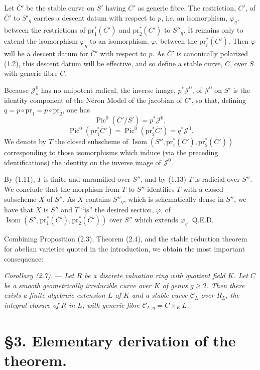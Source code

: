 \documentclass[10pt]{article}
\newcommand{\Isom}{\operatorname{Isom}}
\newcommand{\Pic}{\operatorname{Pic}}
\begin{document}
Let $\overline C'$ be the stable curve on $S'$ having $C'$ as generic fibre. The restriction, $C'$, of $\overline C'$ to $S'_\eta$ carries a descent datum with respect to $p$, i.e. an isomorphism, $\varphi_\eta$, between the restrictions of $\mathrm{pr}_1^*(\overline C')$ and $\mathrm{pr}_2^*(\overline C')$ to $S''_\eta$. It remains only to extend the isomorphism $\varphi_\eta$ to an isomorphism, $\varphi$, between the $\mathrm{pr}_i^*(\overline C')$. Then $\varphi$ will be a descent datum for $\overline C'$ with respect to $p$. As $\overline C'$ is canonically polarized (1.2), this descent datum will be effective, and so define a stable curve, $\overline C$, over $S$ with generic fibre $C$.

Because $\mathscr J_s^0$ has no unipotent radical, the inverse image, $p^*\mathscr J^0$, of $\mathscr J^0$ on $S'$ is the identity component of the Néron Model of the jacobian of $C'$, so that, defining $q=p\circ\mathrm{pr}_1=p\circ\mathrm{pr}_2$, one has
\[
\Pic^0(\overline C'/S')=p^*\mathscr J^0,
\]
\[
\Pic^0(\mathrm{pr}_1^*\overline C')=\Pic^0(\mathrm{pr}_2^*\overline C')=q^*\mathscr J^0.
\]
We denote by $T$ the closed subscheme of $\Isom(S'',\mathrm{pr}_1^*(\overline C'),\mathrm{pr}_2^*(\overline C'))$ corresponding to those isomorphisms which induce (via the preceding identifications) the identity on the inverse image of $\mathscr J^0$.

By (1.11), $T$ is finite and unramified over $S''$, and by (1.13) $T$ is radicial over $S''$. We conclude that the morphism from $T$ to $S''$ identifies $T$ with a closed subscheme $X$ of $S''$. As $X$ contains $S''_\eta$, which is schematically dense in $S''$, we have that $X$ is $S''$ and $T$ ``is'' the desired section, $\varphi$, of $\Isom(S'',\mathrm{pr}_1^*(\overline C'),\mathrm{pr}_2^*(\overline C'))$ over $S''$ which extends $\varphi_\eta$. Q.E.D.

Combining Proposition (2.3), Theorem (2.4), and the stable reduction theorem for abelian varieties quoted in the introduction, we obtain the most important consequence:

\medskip
\noindent\emph{Corollary (2.7).} --- \emph{Let $R$ be a discrete valuation ring with quotient field $K$. Let $C$ be a smooth geometrically irreducible curve over $K$ of genus $g\geq2$. Then there exists a finite algebraic extension $L$ of $K$ and a stable curve $\mathscr C_L$ over $R_L$, the integral closure of $R$ in $L$, with generic fibre $\mathscr C_{L,\eta}=C\times_K L$.}

\section*{\S 3. Elementary derivation of the theorem.}
\end{document}
